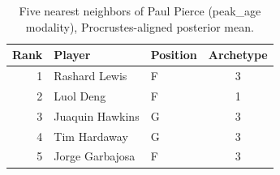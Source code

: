 \begin{table}[htbp]
  \centering\small
  \begin{tabular}{rllc}
    \toprule
    Rank & Player & Position & Archetype \\
    \midrule
    1 & Rashard Lewis & F & 3 \\
    2 & Luol Deng & F & 1 \\
    3 & Juaquin Hawkins & G & 3 \\
    4 & Tim Hardaway & G & 3 \\
    5 & Jorge Garbajosa & F & 3 \\
    \bottomrule
  \end{tabular}
  \caption{Five nearest neighbors of Paul Pierce (peak_age modality), Procrustes-aligned posterior mean.}
  \label{tab:Paul_Pierce_neighbors_peak_age}
\end{table}

